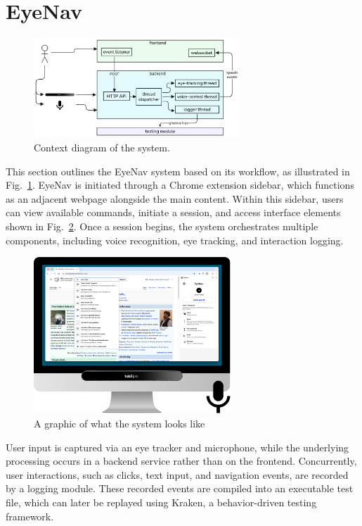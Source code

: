 
\section{EyeNav}

\begin{figure}
    \centering
    \includegraphics[width=220pt]{imgs/diagram-context.png}
    \caption{Context diagram of the system.}
    \label{fig:context}
\end{figure}

This section outlines the EyeNav system based on its workflow, as illustrated in Fig.~\ref{fig:context}. EyeNav is initiated through a Chrome extension sidebar, which functions as an adjacent webpage alongside the main content. Within this sidebar, users can view available commands, initiate a session, and access interface elements shown in Fig.~\ref{fig:requirements}. Once a session begins, the system orchestrates multiple components, including voice recognition, eye tracking, and interaction logging.

\begin{figure}
    \centering
    \includegraphics[width=210pt]{imgs/system-requirements.png}
    \caption{A graphic of what the system looks like}
    \label{fig:requirements}
\end{figure}

User input is captured via an eye tracker and microphone, while the underlying processing occurs in a backend service rather than on the frontend. Concurrently, user interactions, such as clicks, text input, and navigation events, are recorded by a logging module. These recorded events are compiled into an executable test file, which can later be replayed using Kraken, a behavior-driven testing framework.




